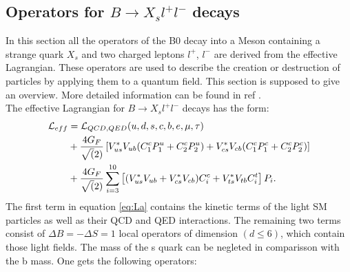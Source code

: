 \documentclass[english]{uzhpub}
\begin{document}
\subsection{Operators for $B \rightarrow X_s l^+l^-$ decays}
In this section all the operators of the B0 decay into a Meson containing a strange quark $X_s$ and two charged leptons $l^+$, $l^-$ are derived from the effective Lagrangian. These operators  are used to describe the creation or destruction of particles  by applying them to a quantum field.
This section is supposed to give an overview. More detailed information can be found in ref \cite{bib:Operators}. \\
The effective Lagrangian for $B \rightarrow X_s l^+l^-$ decays has the form:
\begin{align}
 \mathcal{L}_{eff} & = \mathcal{L}_{QCD,QED}(u,d,s,c,b,e,\mu,\tau) \notag                                                                                           \\
                   & + \frac{4G_F}{\sqrt(2)} \left[ V_{us}^* V_{ub} (C_1^c P_1^u + C_2^c P_2^u) + V_{cs}^* V_{cb} (C_1^c P_1^c + C_2^c P_2^c) \right] \label{eq:La} \\
                   & + \frac{4G_F}{\sqrt(2)} \sum_{i=3}^{10} \left[ (V_{us}^* V_{ub} + V_{cs}^* V_{cb})C_i^c + V_{ts}^* V_{tb} C_i^t  \right]P_i . \notag
\end{align}
The first term in equation \ref{eq:La} contains the kinetic terms of the light SM particles as well as their QCD and QED interactions. The remaining two terms consist of $\Delta B = - \Delta S =1$ local operators of dimension $(d \leq 6)$, which contain those light fields. The mass of the s quark can be negleted in comparisson with the b mass. One gets the following operators:
\end{document}
